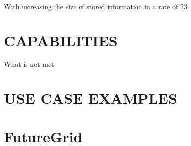 \documentclass{sig-alternate}
\begin{document}
With increasing the size of stored information in a rate of 23%

\section{CAPABILITIES}

What is not met.

\section{USE CASE EXAMPLES}

\section{FutureGrid}
\end{document}
